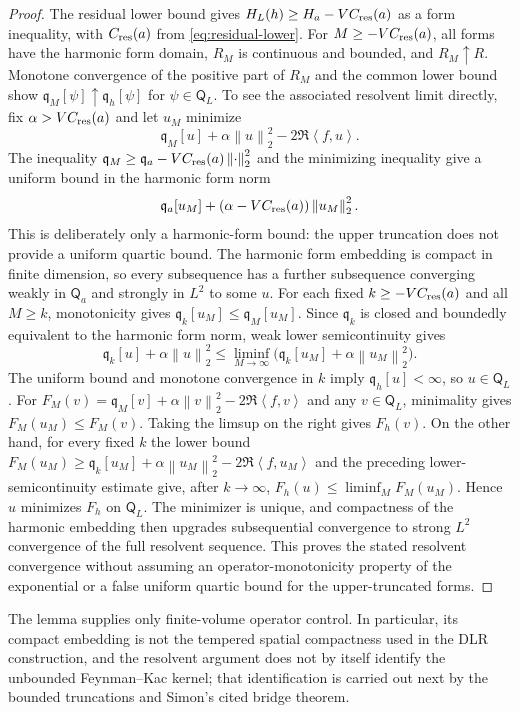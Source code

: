 \documentclass[11pt]{article}
\numberwithin{equation}{section}
\theoremstyle{definition}
\newcommand{\norm}[1]{\left\lVert#1\right\rVert}
\newcommand{\ip}[2]{\left\langle#1,#2\right\rangle}
\begin{document}
\begin{proof}
The residual lower bound gives $H_L(h)\geq H_a-VC_{\rm res}(a)$ as a form inequality,
with $C_{\rm res}(a)$ from \eqref{eq:residual-lower}.  For
$M\geq-VC_{\rm res}(a)$, all forms have the harmonic form domain, $R_M$ is
continuous and bounded, and $R_M\uparrow R$.  Monotone convergence of the
positive part of $R_M$ and the common lower bound show
$\mathfrak q_M[\psi]\uparrow\mathfrak q_h[\psi]$
for $\psi\in\mathsf Q_L$.  To see the associated resolvent limit directly, fix $\alpha>VC_{\rm res}(a)$ and let $u_M$ minimize
\[
 \mathfrak q_M[u]+\alpha\norm{u}_2^2-2\Re\ip{f}{u}.
\]
The inequality $\mathfrak q_M\geq\mathfrak q_a-VC_{\rm res}(a)\norm{\cdot}_2^2$ and the
minimizing inequality give a uniform bound in the harmonic form norm
\[
 \mathfrak q_a[u_M]+(\alpha-VC_{\rm res}(a))\norm{u_M}_2^2.
\]
This is deliberately only a harmonic-form bound: the upper truncation does not
provide a uniform quartic bound.  The harmonic form embedding is compact in
finite dimension, so every subsequence has a further subsequence converging
weakly in $\mathsf Q_a$ and strongly in $L^2$ to some $u$.  For each fixed
$k\geq-VC_{\rm res}(a)$ and all $M\geq k$, monotonicity gives
$\mathfrak q_k[u_M]\leq\mathfrak q_M[u_M]$.  Since $\mathfrak q_k$ is closed and
boundedly equivalent to the harmonic form norm, weak lower semicontinuity gives
\[
 \mathfrak q_k[u]+\alpha\norm{u}_2^2\leq
 \liminf_{M\rightarrow\infty}\bigl(\mathfrak q_k[u_M]+\alpha\norm{u_M}_2^2\bigr).
\]
The uniform bound and monotone convergence in $k$ imply
$\mathfrak q_h[u]<\infty$, so $u\in\mathsf Q_L$.  For
$F_M(v)=\mathfrak q_M[v]+\alpha\norm{v}_2^2-2\Re\ip{f}{v}$ and any $v\in\mathsf Q_L$,
minimality gives $F_M(u_M)\leq F_M(v)$.  Taking the limsup on the right gives
$F_h(v)$.  On the other hand, for every fixed $k$ the lower bound
$F_M(u_M)\geq\mathfrak q_k[u_M]+\alpha\norm{u_M}_2^2-2\Re\ip{f}{u_M}$ and the preceding lower-semicontinuity estimate give, after $k\rightarrow\infty$,
$F_h(u)\leq\liminf_MF_M(u_M)$.  Hence $u$ minimizes $F_h$ on $\mathsf Q_L$.
The minimizer is unique, and compactness of the harmonic embedding then upgrades
subsequential convergence to strong $L^2$ convergence of the full resolvent
sequence.  This proves the stated resolvent convergence without assuming an
operator-monotonicity property of the exponential or a false uniform quartic
bound for the upper-truncated forms.
\end{proof}

The lemma supplies only finite-volume operator control.  In particular, its
compact embedding is not the tempered spatial compactness used in the DLR
construction, and the resolvent argument does not by itself identify the
unbounded Feynman--Kac kernel; that identification is carried out next by the
bounded truncations and Simon's cited bridge theorem.
\end{document}

